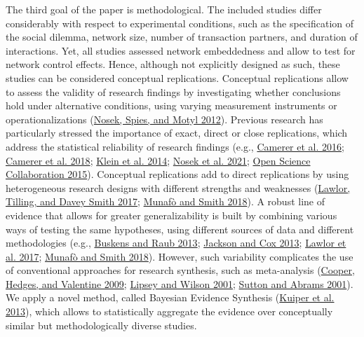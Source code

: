 \documentclass[
  11pt,
]{article}
\begin{document}
The third goal of the paper is methodological.
The included studies differ considerably with respect to experimental conditions, such as the specification of the social dilemma, network size, number of transaction partners, and duration of interactions.
Yet, all studies assessed network embeddedness and allow to test for network control effects.
Hence, although not explicitly designed as such, these studies can be considered conceptual replications.
Conceptual replications allow to assess the validity of research findings by investigating whether conclusions hold under alternative conditions, using varying measurement instruments or operationalizations (\protect\hyperlink{ref-nosek_scientific_2012}{Nosek, Spies, and Motyl 2012}).
Previous research has particularly stressed the importance of exact, direct or close replications, which address the statistical reliability of research findings (e.g., \protect\hyperlink{ref-camerer2016evaluating}{Camerer et al. 2016}; \protect\hyperlink{ref-camerer2018evaluating}{Camerer et al. 2018}; \protect\hyperlink{ref-klein_etal_replicability_2014}{Klein et al. 2014}; \protect\hyperlink{ref-nosek_replicability_review_2021}{Nosek et al. 2021}; \protect\hyperlink{ref-open_science_collab_2015}{Open Science Collaboration 2015}).
Conceptual replications add to direct replications by using heterogeneous research designs with different strengths and weaknesses (\protect\hyperlink{ref-lawlor_triangulation_2017}{Lawlor, Tilling, and Davey Smith 2017}; \protect\hyperlink{ref-munafo_robust_2018}{Munafò and Smith 2018}).
A robust line of evidence that allows for greater generalizability is built by combining various ways of testing the same hypotheses, using different sources of data and different methodologies (e.g., \protect\hyperlink{ref-buskens_raub_handbook_2013}{Buskens and Raub 2013}; \protect\hyperlink{ref-jackson_cox_experimental_2013}{Jackson and Cox 2013}; \protect\hyperlink{ref-lawlor_triangulation_2017}{Lawlor et al. 2017}; \protect\hyperlink{ref-munafo_robust_2018}{Munafò and Smith 2018}).
However, such variability complicates the use of conventional approaches for research synthesis, such as meta-analysis (\protect\hyperlink{ref-cooper_handbook_2009}{Cooper, Hedges, and Valentine 2009}; \protect\hyperlink{ref-lipsey_wilson_2001}{Lipsey and Wilson 2001}; \protect\hyperlink{ref-sutton_bayesian_meta2001}{Sutton and Abrams 2001}).
We apply a novel method, called Bayesian Evidence Synthesis (\protect\hyperlink{ref-kuiper_combining_2013}{Kuiper et al. 2013}), which allows to statistically aggregate the evidence over conceptually similar but methodologically diverse studies.
\end{document}
